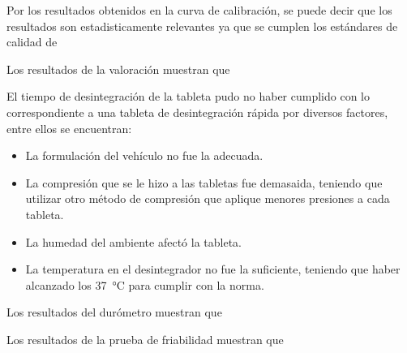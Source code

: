 Por los resultados obtenidos en la curva de calibración, se puede decir que los resultados
son estadisticamente relevantes ya que se cumplen los estándares de calidad de %

Los resultados de la valoración muestran que %

El tiempo de desintegración de la tableta pudo no haber cumplido con lo correspondiente
a una tableta de desintegración rápida por diversos factores, entre ellos se encuentran:
\begin{itemize}
    \item La formulación del vehículo no fue la adecuada.
    \item La compresión que se le hizo a las tabletas fue demasaida, teniendo que utilizar otro método de compresión que aplique menores presiones a cada tableta.
    \item La humedad del ambiente afectó la tableta.
    \item La temperatura en el desintegrador no fue la suficiente, teniendo que haber alcanzado los \SI{37}{\degreeCelsius} para cumplir con la norma.
\end{itemize}

Los resultados del durómetro muestran que %

Los resultados de la prueba de friabilidad muestran que %